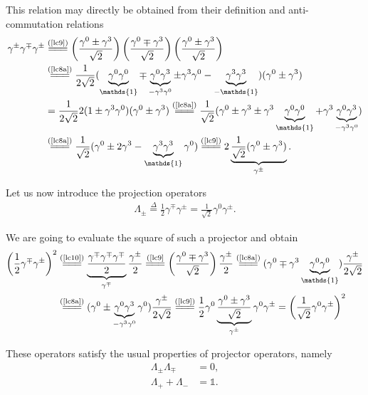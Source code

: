 \begin{note} \noindent
This relation may directly be obtained from their definition and anti-commutation relations
\begin{align*}
\gamma^\pm\gamma^\mp\gamma^\pm&\stackrel{(\text{\cref{lc9}})}{=\joinrel=\joinrel=}\left(\frac{\gamma^0\pm\gamma^3}{\sqrt{2}}\right)\left(\frac{\gamma^0\mp\gamma^3}{\sqrt{2}}\right)\left(\frac{\gamma^0\pm\gamma^3}{\sqrt{2}}\right)\\
&\stackrel{(\text{\cref{lc8a}})}{=\joinrel=\joinrel=}\frac{1}{2\sqrt{2}}(\underbrace{\gamma^0\gamma^0}_\mathds{1}\mp\underbrace{\gamma^0\gamma^3}_{-\gamma^3\gamma^0}\pm\gamma^3\gamma^0-\underbrace{\gamma^3\gamma^3}_{-\mathds{1}})(\gamma^0\pm\gamma^3)\\
&=\frac{1}{2\sqrt{2}}2(1\pm\gamma^3\gamma^0)(\gamma^0\pm\gamma^3)\stackrel{(\text{\cref{lc8a}})}{=\joinrel=\joinrel=}\frac{1}{\sqrt{2}}(\gamma^0\pm\gamma^3\pm\gamma^3\underbrace{\gamma^0\gamma^0}_\mathds{1}+\gamma^3\underbrace{\gamma^0\gamma^3}_{-\gamma^3\gamma^0})\\
&\stackrel{(\text{\cref{lc8a}})}{=\joinrel=\joinrel=}\frac{1}{\sqrt{2}}(\gamma^0\pm 2\gamma^3-\underbrace{\gamma^3\gamma^3}_\mathds{1}\gamma^0)\stackrel{(\text{\cref{lc9}})}{=\joinrel=\joinrel=}2\underbrace{\frac{1}{\sqrt{2}}(\gamma^0\pm\gamma^3)}_{\gamma^\pm}.
\end{align*}
\end{note}\noindent
Let us now introduce the projection operators
\begin{align}
\label{lc12}
\Lambda_\pm\overset{\Delta}{=}\frac{1}{2}\gamma^\mp\gamma^\pm=\frac{1}{\sqrt{2}}\gamma^0\gamma^\pm.
\end{align}

\begin{note}\noindent
We are going to evaluate the square of such a projector and obtain
\begin{align*}
\left(\frac{1}{2}\gamma^\mp\gamma^\pm\right)^2&\stackrel{(\text{\cref{lc10}})}{=\joinrel=\joinrel=}\underbrace{\frac{\gamma^\mp\gamma^\mp\gamma^\mp}{2}}_{\gamma^\mp}\frac{\gamma^\pm}{2}\stackrel{(\text{\cref{lc9}}}{=\joinrel=\joinrel=}\left(\frac{\gamma^0\mp\gamma^3}{\sqrt{2}}\right)\frac{\gamma^\pm}{2}\stackrel{(\text{\cref{lc8a}})}{=\joinrel=\joinrel=}(\gamma^0\mp\gamma^3\underbrace{\gamma^0\gamma^0}_\mathds{1})\frac{\gamma^\pm}{2\sqrt{2}}\\
&\stackrel{(\text{\cref{lc8a}})}{=\joinrel=\joinrel=}(\gamma^0\pm\underbrace{\gamma^0\gamma^3}_{-\gamma^3\gamma^0}\gamma^0)\frac{\gamma^\pm}{2\sqrt{2}}\stackrel{(\text{\cref{lc9}})}{=\joinrel=\joinrel=}\frac{1}{2}\gamma^0\underbrace{\frac{\gamma^0\pm\gamma^3}{\sqrt{2}}}_{\gamma^\pm}\gamma^0\gamma^\pm=\left(\frac{1}{\sqrt{2}}\gamma^0\gamma^\pm\right)^2
\end{align*}
\end{note}
\noindent
These operators satisfy the usual properties of projector operators, namely
\begin{subequations}
\begin{align}
\Lambda_\pm\Lambda_\mp&=0, \label{lc24a} \\ 
\Lambda_++\Lambda_-&=\mathds{1}. \label{lc24b}
\end{align}
\end{subequations}

